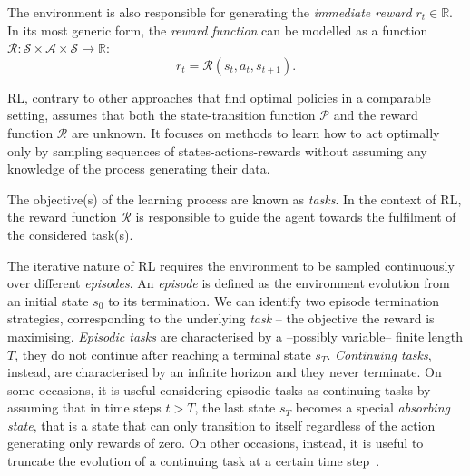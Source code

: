 The environment is also responsible for generating the \emph{immediate reward} $r_t \in \mathbb{R}$.
In its most generic form, the \emph{reward function} can be modelled as a function $\mathcal{R}: \mathcal{S} \times \mathcal{A} \times \mathcal{S} \to \mathbb{R}$:
%
\begin{equation*}
    r_t = \mathcal{R}(s_t, a_t, s_{t+1}) .
\end{equation*}

\acl{RL}, contrary to other approaches that find optimal policies in a comparable setting, assumes that both the state-transition function $\mathcal{P}$ and the reward function $\mathcal{R}$ are unknown.
It focuses on methods to learn how to act optimally only by sampling sequences of states-actions-rewards without assuming any knowledge of the process generating their data.

The objective(s) of the learning process are known as \emph{tasks}.
In the context of \ac{RL}, the reward function $\mathcal{R}$ is responsible to guide the agent towards the fulfilment of the considered task(s).

\begin{remark*}
%
The iterative nature of \ac{RL} requires the environment to be sampled continuously over different \emph{episodes}.
An \emph{episode} is defined as the environment evolution from an initial state $s_0$ to its termination.
We can identify two episode termination strategies, corresponding to the underlying \emph{task} -- the objective the reward is maximising.
\emph{Episodic tasks} are characterised by a --possibly variable-- finite length $T$, \ie they do not continue after reaching a terminal state $s_T$.
\emph{Continuing tasks}, instead, are characterised by an infinite horizon and they never terminate.
On some occasions, it is useful considering episodic tasks as continuing tasks by assuming that in time steps $t > T$, the last state $s_T$ becomes a special \emph{absorbing state}, that is a state that can only transition to itself regardless of the action generating only rewards of zero.
On other occasions, instead, it is useful to truncate the evolution of a continuing task at a certain time step~\parencite{pardo_time_2022}.
%
\end{remark*}

